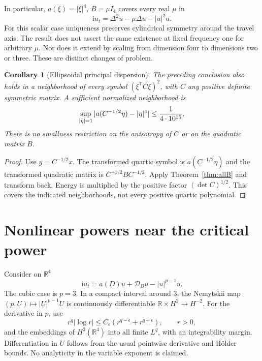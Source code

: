 \documentclass[11pt,a4paper]{article}
\newtheorem{corollary}[theorem]{Corollary}
\theoremstyle{remark}\newtheorem{remark}[theorem]{Remark}
\newcommand{\R}{\mathbb R}\newcommand{\C}{\mathbb C}
\newcommand{\ii}{\mathrm i}\newcommand{\dd}{\,\mathrm d}
\begin{document}
In particular, $a(\xi)=|\xi|^4$, $B=\mu I_4$ covers every real $\mu$ in
\[
 \ii u_t=\Delta^2u-\mu\Delta u-|u|^2u.
\]
For this scalar case uniqueness preserves cylindrical symmetry around the travel axis. The result does not assert the same existence at fixed frequency one for arbitrary $\mu$. Nor does it extend by scaling from dimension four to dimensions two or three. These are distinct changes of problem.

\begin{corollary}[Ellipsoidal principal dispersion]
The preceding conclusion also holds in a neighborhood of every symbol $(\xi^{\mathsf T}C\xi)^2$, with $C$ any positive definite symmetric matrix. A sufficient normalized neighborhood is
\[
 \sup_{|\eta|=1}|a(C^{-1/2}\eta)-|\eta|^4|
 \le {1\over4\cdot10^{15}}.
\]
There is no smallness restriction on the anisotropy of $C$ or on the quadratic matrix $B$.
\end{corollary}
\begin{proof}
Use $y=C^{-1/2}x$. The transformed quartic symbol is $a(C^{-1/2}\eta)$ and the transformed quadratic matrix is $C^{-1/2}BC^{-1/2}$. Apply Theorem~\ref{thm:allB} and transform back. Energy is multiplied by the positive factor $(\det C)^{1/2}$. This covers the indicated neighborhoods, not every positive quartic polynomial.
\end{proof}

\section{Nonlinear powers near the critical power}
Consider on $\R^4$
\begin{equation}\label{eq:power}
 \ii u_t=a(D)u+\mathcal D_Bu-|u|^{p-1}u.
\end{equation}
The cubic case is $p=3$. In a compact interval around $3$, the Nemytskii map $(p,U)\mapsto |U|^{p-1}U$ is continuously differentiable $\R\times H^2\to H^{-2}$. For the derivative in $p$, use
\[
 r^q|\log r|\le C_\epsilon(r^{q-\epsilon}+r^{q+\epsilon}),\qquad r>0,
\]
and the embeddings of $H^2(\R^4)$ into all finite $L^q$, with an integrability margin. Differentiation in $U$ follows from the usual pointwise derivative and H\"older bounds. No analyticity in the variable exponent is claimed.
\end{document}
